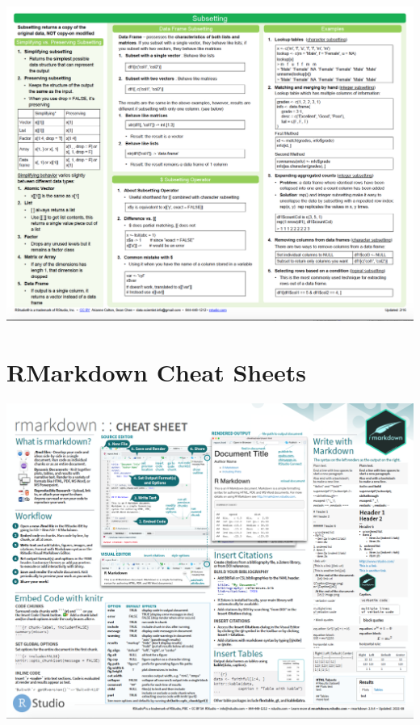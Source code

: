 \documentclass[
]{book}
\theoremstyle{definition}
\theoremstyle{definition}
\theoremstyle{definition}
\theoremstyle{definition}
\theoremstyle{remark}
\begin{document}
\begin{center}\includegraphics{Figures/R-cheat-sheet3} \end{center}

\hypertarget{rmarkdown-cheat-sheets}{%
\section*{RMarkdown Cheat Sheets}\label{rmarkdown-cheat-sheets}}

\begin{center}\includegraphics{Figures/RmarkdownCheatSheet1} \end{center}
\end{document}
